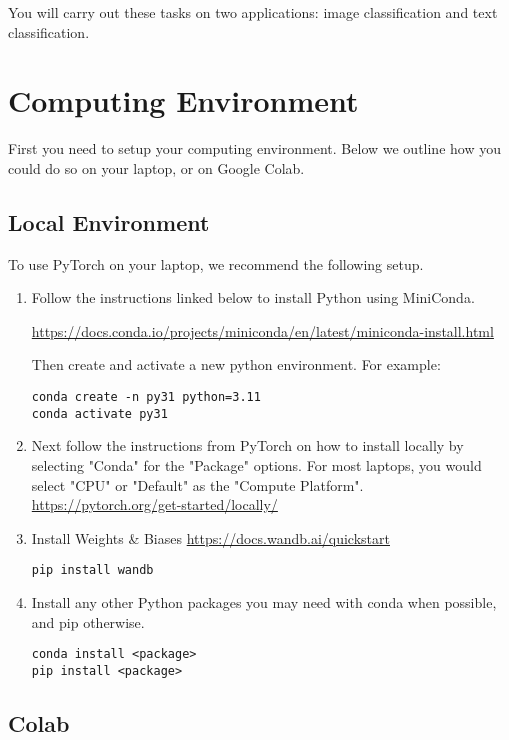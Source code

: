 \documentclass[11pt,addpoints,answers]{exam}
\begin{document}
You will carry out these tasks on two applications: image classification and text classification.

\clearpage

\section*{Computing Environment}
\label{sec:env}

First you need to setup your computing environment. Below we outline how you could do so on your laptop, or on Google Colab.

\subsection*{Local Environment}
\label{sec:local}

To use PyTorch on your laptop, we recommend the following setup.

\begin{enumerate}
\item Follow the instructions linked below to install Python using MiniConda.  

\url{https://docs.conda.io/projects/miniconda/en/latest/miniconda-install.html}

Then create and activate a new python environment. For example:
\begin{verbatim}
conda create -n py31 python=3.11
conda activate py31
\end{verbatim}
\item Next follow the instructions from PyTorch on how to install locally by selecting "Conda" for the "Package" options. For most laptops, you would select "CPU" or "Default" as the "Compute Platform". \url{https://pytorch.org/get-started/locally/}
\item Install Weights \& Biases \url{https://docs.wandb.ai/quickstart}
\begin{verbatim}
pip install wandb
\end{verbatim}
\item Install any other Python packages you may need with conda when possible, and pip otherwise.
\begin{verbatim}
conda install <package>
pip install <package>
\end{verbatim}
\end{enumerate}

\subsection*{Colab}
\label{sec:colab}
\end{document}
